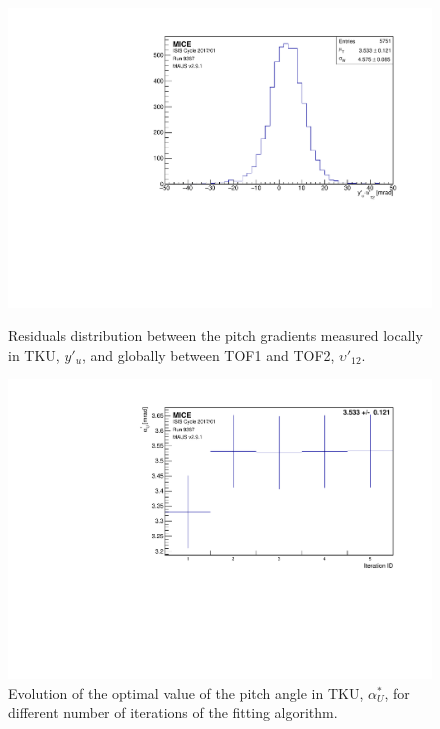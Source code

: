 \begin{figure} [!htb]
	\begin{minipage}[b]{.48\textwidth}
		\centering
		\includegraphics[width=\textwidth]{tku_resyp.pdf}
		\caption{Residuals distribution between the pitch gradients measured locally in TKU, $y'_u$, and globally between TOF1 and TOF2, $\upsilon'_{12}$.}
		\label{fig:resyp}
	\end{minipage}
	\hfill
	\begin{minipage}[b]{.48\textwidth}
		\centering
		\includegraphics[width=\textwidth]{tku_optalpha.pdf}
		\caption{Evolution of the optimal value of the pitch angle in TKU, $\alpha_U^*$, for different number of iterations of the fitting algorithm.}
		\label{fig:optalpha}
	\end{minipage}
\end{figure}

